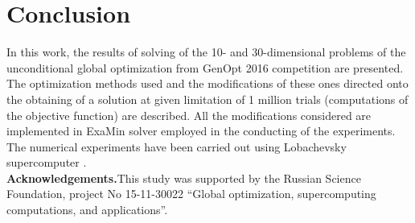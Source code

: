 \documentclass{llncs}
\begin{document}
\section{Conclusion}
In this work, the results of solving of the 10- and 30-dimensional problems of the unconditional global optimization from GenOpt 2016 competition are presented. The optimization methods used and the modifications of these ones directed onto the obtaining of a solution at given limitation of 1 million trials (computations of the objective function) are described. All the modifications considered are implemented in ExaMin solver employed in the conducting of the experiments. The numerical experiments have been carried out using Lobachevsky supercomputer \cite{Lobach}.\\


\textbf{Acknowledgements.}This study was supported by the Russian Science Foundation, project No 15-11-30022 ``Global optimization, supercomputing computations, and applications''.
\end{document}
